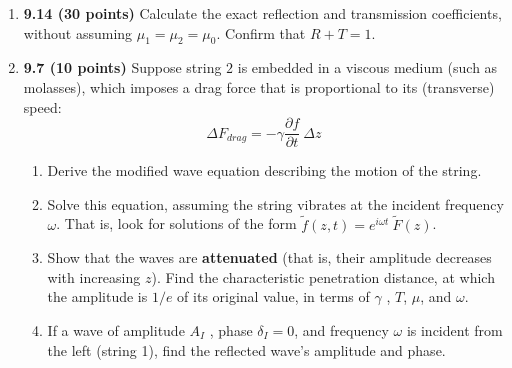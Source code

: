 \documentclass[fleqn]{article}
\begin{document}
\begin{enumerate}
    \item \textbf{9.14 (30 points)} Calculate the exact reflection and transmission coefficients, without assuming $\mu_1=\mu_2=\mu_0$. 
    Confirm that $R+T=1$.



    \item \textbf{9.7 (10 points)} Suppose string $2$ is embedded in a viscous medium (such as molasses), which imposes a drag force 
    that is proportional to its (transverse) speed:
    $$
      \Delta F_{drag}=-\gamma \dfrac{\partial f}{\partial t} ~ \Delta z
    $$
    \begin{enumerate}
      \item Derive the modified wave equation describing the motion of the string.


      \item Solve this equation, assuming the string vibrates at the incident frequency $\omega$. That is, look for solutions of the
      form $\tilde{f}(z,t)=e^{i \omega t} ~ \tilde{F}(z)$.


      \item Show that the waves are \textbf{attenuated} (that is, their amplitude decreases with increasing $z$). Find the characteristic penetration distance, at which the amplitude
      is $1/e$ of its original value, in terms of $\gamma$ , $T$, $\mu$, and $\omega$.


      \item If a wave of amplitude $A_I$ , phase $\delta_I=0$, and frequency $\omega$ is incident from the left (string 1), find the reflected wave’s
      amplitude and phase.


    \end{enumerate}


  \end{enumerate}
\end{document}
